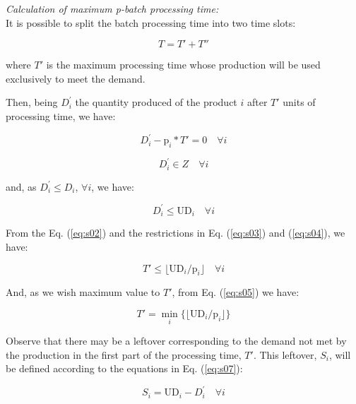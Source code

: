 \documentclass[10pt,fleqn,a4paper,twoside]{article}
\begin{document}
\noindent \emph{Calculation of maximum p-batch processing time:} \\

It is possible to split the batch processing time into two time slots:

\begin{equation}
T = T' + T''
\end{equation}

\noindent where $T'$ is the maximum processing time whose production will be used exclusively to meet the demand.

Then, being $D_{i}^{'}$ the quantity produced of the product $i$ after $T'$ units of processing time, we have:

\begin{equation}
\label{eq:s02}
D_{i}^{'} - \textrm{p}_i * T'  = 0 \quad \forall i
\end{equation}

\begin{equation}
\label{eq:s03}
D_{i}^{'} \in Z \quad \forall i
\end{equation}

\noindent and, as $D_{i}^{'} \leq D_i$, $\forall i$, we have:

\begin{equation}
\label{eq:s04}
D_{i}^{'} \leq \textrm{UD}_i\quad \forall i
\end{equation}

From the Eq. (\ref{eq:s02}) and the restrictions in Eq. (\ref{eq:s03}) and (\ref{eq:s04}), we have:

\begin{equation}
\label{eq:s05}
T' \leq \lfloor{\textrm{UD}_i / \textrm{p}_i}\rfloor \quad \forall i
\end{equation}

And, as we wish maximum value to $T'$, from Eq. (\ref{eq:s05}) we have:

\begin{equation}
\label{eq:s06}
T' = \min_i\{\lfloor{\textrm{UD}_i / \textrm{p}_i}\rfloor\}
\end{equation}

Observe that there may be a leftover corresponding to the demand not met by the production in the first part of the processing time, $T'$. This leftover, $S_i$, will be defined according to the equations in Eq. (\ref{eq:s07}):

\begin{equation}
\label{eq:s07}
S_i = \textrm{UD}_i - D_{i}^{'} \quad \forall i
\end{equation}
\end{document}
